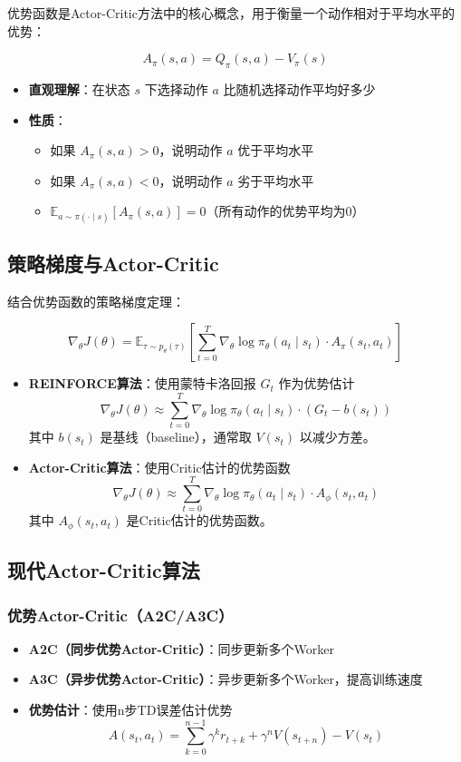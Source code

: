 优势函数是Actor-Critic方法中的核心概念，用于衡量一个动作相对于平均水平的优势：

\[
A_\pi(s, a) = Q_\pi(s, a) - V_\pi(s)
\]

\begin{itemize}
    \item \textbf{直观理解}：在状态 $s$ 下选择动作 $a$ 比随机选择动作平均好多少
    \item \textbf{性质}：
    \begin{itemize}
        \item 如果 $A_\pi(s, a) > 0$，说明动作 $a$ 优于平均水平
        \item 如果 $A_\pi(s, a) < 0$，说明动作 $a$ 劣于平均水平
        \item $\mathbb{E}_{a \sim \pi(\cdot \mid s)}[A_\pi(s, a)] = 0$（所有动作的优势平均为0）
    \end{itemize}
\end{itemize}

\subsection{策略梯度与Actor-Critic}

结合优势函数的策略梯度定理：

\[
\nabla_\theta J(\theta) = \mathbb{E}_{\tau \sim p_\theta(\tau)}\left[\sum_{t=0}^T \nabla_\theta \log \pi_\theta(a_t \mid s_t) \cdot A_\pi(s_t, a_t)\right]
\]

\begin{itemize}
    \item \textbf{REINFORCE算法}：使用蒙特卡洛回报 $G_t$ 作为优势估计
    \[
    \nabla_\theta J(\theta) \approx \sum_{t=0}^T \nabla_\theta \log \pi_\theta(a_t \mid s_t) \cdot (G_t - b(s_t))
    \]
    其中 $b(s_t)$ 是基线（baseline），通常取 $V(s_t)$ 以减少方差。
    
    \item \textbf{Actor-Critic算法}：使用Critic估计的优势函数
    \[
    \nabla_\theta J(\theta) \approx \sum_{t=0}^T \nabla_\theta \log \pi_\theta(a_t \mid s_t) \cdot A_\phi(s_t, a_t)
    \]
    其中 $A_\phi(s_t, a_t)$ 是Critic估计的优势函数。
\end{itemize}

\subsection{现代Actor-Critic算法}

\subsubsection{优势Actor-Critic（A2C/A3C）}
\begin{itemize}
    \item \textbf{A2C（同步优势Actor-Critic）}：同步更新多个Worker
    \item \textbf{A3C（异步优势Actor-Critic）}：异步更新多个Worker，提高训练速度
    \item \textbf{优势估计}：使用n步TD误差估计优势
    \[
    A(s_t, a_t) = \sum_{k=0}^{n-1} \gamma^k r_{t+k} + \gamma^n V(s_{t+n}) - V(s_t)
    \]
\end{itemize}

